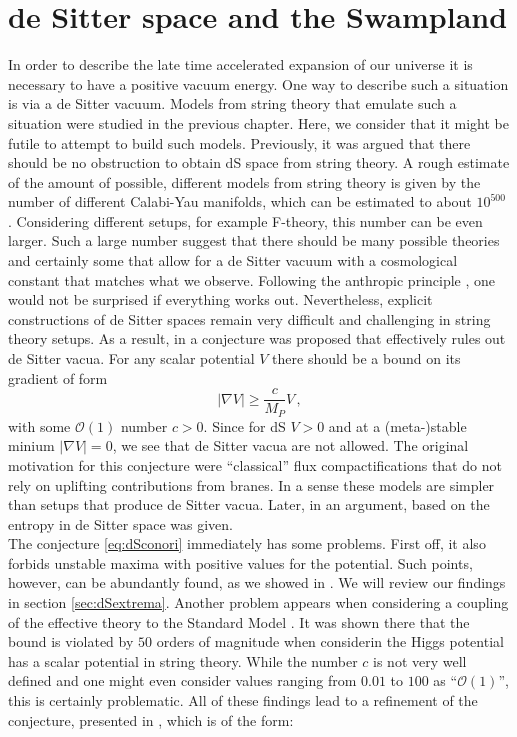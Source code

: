 \documentclass[12pt]{report}
\newcommand{\be}{\begin{equation}}
\newcommand{\ee}{\end{equation}}
\begin{document}
\section{de Sitter space and the Swampland}
In order to describe the late time accelerated expansion of our universe it is necessary to have a positive vacuum energy. One way to describe such a situation is via a de Sitter vacuum. Models from string theory that emulate such a situation were studied in the previous chapter. Here, we consider that it might be futile to attempt to build such models. Previously, it was argued that there should be no obstruction to obtain dS space from string theory. A rough estimate of the amount of possible, different models from string theory is given by the number of different Calabi-Yau manifolds, which can be estimated to about $10^{500}$ \cite{Blumenhagen:2004xx}. Considering different setups, for example F-theory, this number can be even larger. Such a large number suggest that there should be many possible theories and certainly some that allow for a de Sitter vacuum with a cosmological constant that matches what we observe. Following the anthropic principle \cite{Weinberg:1987dv}, one would not be surprised if everything works out. Nevertheless, explicit constructions of de Sitter spaces remain very difficult and challenging in string theory setups. As a result, in \cite{Obied:2018sgi} a conjecture was proposed that effectively rules out de Sitter vacua. For any scalar potential $V$ there should be a bound on its gradient of form
\be 
|\nabla V| \geq \frac{c}{M_P} V\,,
\label{eq:dSconori}
\ee
with some $\mathcal{O}(1)$ number $c>0$. Since for dS $V>0$ and at a (meta-)stable minium $|\nabla V| = 0$, we see that de Sitter vacua are not allowed. The original motivation for this conjecture were ``classical'' flux compactifications that do not rely on uplifting contributions from branes. In a sense these models are simpler than setups that produce de Sitter vacua. Later, in \cite{Ooguri:2018wrx} an argument, based on the entropy in de Sitter space was given.\\
The conjecture \eqref{eq:dSconori} immediately has some problems. First off, it also forbids unstable maxima with positive values for the potential. Such points, however, can be abundantly found, as we showed in \cite{Roupec:2018mbn}. We will review our findings in section \ref{sec:dSextrema}. Another problem appears when considering a coupling of the effective theory to the Standard Model \cite{Denef:2018etk}. It was shown there that the bound is violated by $50$ orders of magnitude when considerin the Higgs potential has a scalar potential in string theory. While the number $c$ is not very well defined and one might even consider values ranging from $0.01$ to $100$ as ``$\mathcal{O}(1)$'', this is certainly problematic. All of these findings lead to a refinement of the conjecture, presented in \cite{Ooguri:2018wrx}, which is of the form:
\end{document}

